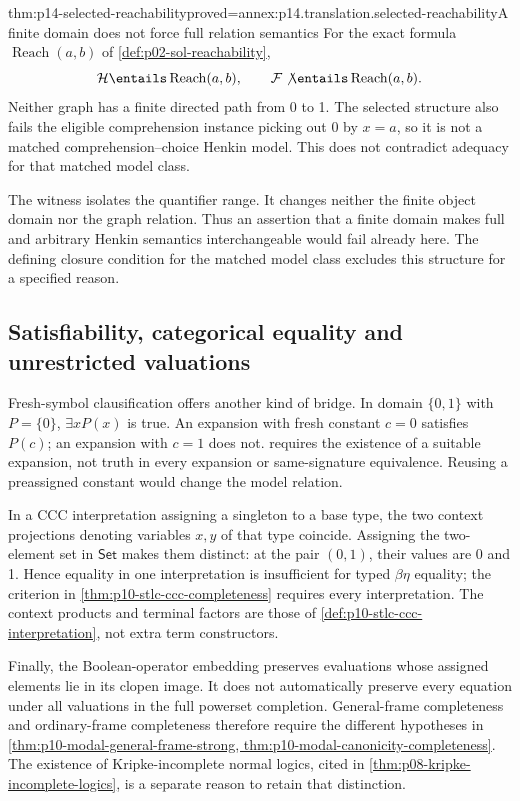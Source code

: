 \begin{hbtheorem}{thm:p14-selected-reachability}{proved=annex:p14.translation.selected-reachability}{A finite domain does not force full relation semantics}
For the exact formula \(\operatorname{Reach}(a,b)\) of
\cref{def:p02-sol-reachability},
\[
 \mathcal H\entails\operatorname{Reach}(a,b),\qquad
 \mathcal F\not\entails\operatorname{Reach}(a,b).
\]
Neither graph has a finite directed path from 0 to 1. The selected structure
also fails the eligible comprehension instance picking out 0 by
\(x=a\), so it is not a matched comprehension--choice Henkin model.
This does not contradict adequacy for that matched model class.
\end{hbtheorem}

The witness isolates the quantifier range. It changes neither the finite
object domain nor the graph relation. Thus an assertion that a finite
domain makes full and arbitrary Henkin semantics interchangeable would
fail already here. The defining closure condition for the matched model
class excludes this structure for a specified reason.

\subsection{Satisfiability, categorical equality and unrestricted valuations}

Fresh-symbol clausification offers another kind of bridge. In domain
\(\{0,1\}\) with \(P=\{0\}\), \(\exists xP(x)\) is true.
An expansion with fresh constant \(c=0\) satisfies \(P(c)\); an expansion
with \(c=1\) does not.  requires the existence
of a suitable expansion, not truth in every expansion or same-signature
equivalence. Reusing a preassigned constant would change the model relation.

In a CCC interpretation assigning a singleton to a base type, the two
context projections denoting variables \(x,y\) of that type coincide.
Assigning the two-element set in \(\mathsf{Set}\) makes them distinct:
at the pair \((0,1)\), their values are 0 and 1. Hence equality in one
interpretation is insufficient for typed \(\beta\eta\) equality; the
criterion in \cref{thm:p10-stlc-ccc-completeness} requires every
interpretation. The context products and terminal factors are those of
\cref{def:p10-stlc-ccc-interpretation}, not extra term constructors.

Finally, the Boolean-operator embedding preserves evaluations whose
assigned elements lie in its clopen image. It does not automatically
preserve every equation under all valuations in the full powerset
completion. General-frame completeness and ordinary-frame completeness
therefore require the different hypotheses in
\cref{thm:p10-modal-general-frame-strong,
thm:p10-modal-canonicity-completeness}. The existence of Kripke-incomplete
normal logics, cited in \cref{thm:p08-kripke-incomplete-logics}, is a
separate reason to retain that distinction.

